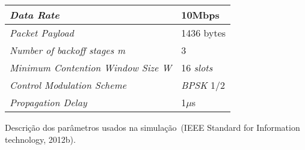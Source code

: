 \documentclass{utfpr-pg}
\begin{document}
\begin{quadro}[h]
	\centering
	\renewcommand{\arraystretch}{1.1}
	\begin{tabular}{|l|l|}
		\hline
		\textit{Data Rate}					&	10Mbps		\\\hline
		\textit{Packet Payload}				&	1436 bytes	\\\hline
		\textit{Number of backoff stages \emph{m}}	&	3			\\\hline
		\textit{Minimum Contention Window Size W}	&	16 \textit{slots} \\\hline
		\textit{Control Modulation Scheme}	&	\textit{BPSK} 1/2 \\\hline
		\textit{Propagation Delay}			&	1$\mu$s		\\
		\hline
	\end{tabular}
	\parbox{0.55\textwidth}{\caption{Descrição dos parâmetros usados na simulação~(IEEE Standard for Information technology, 2012b).}}
	\label{table:SimulationParameters}
\end{quadro}


% 

\postextual



\end{document}
